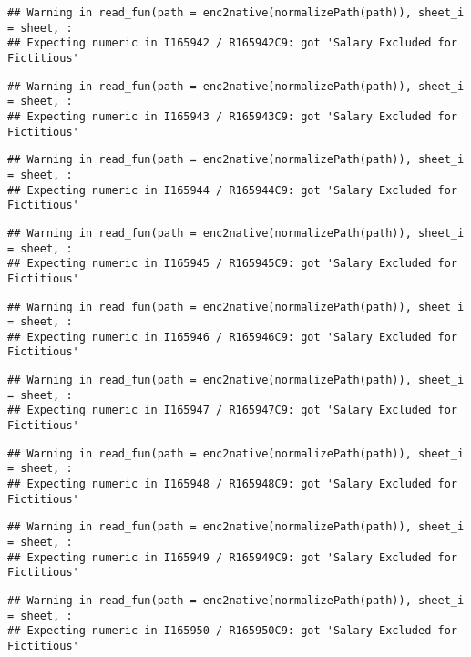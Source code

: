 \documentclass[
]{article}
\begin{document}
\begin{verbatim}
## Warning in read_fun(path = enc2native(normalizePath(path)), sheet_i = sheet, :
## Expecting numeric in I165942 / R165942C9: got 'Salary Excluded for Fictitious'
\end{verbatim}

\begin{verbatim}
## Warning in read_fun(path = enc2native(normalizePath(path)), sheet_i = sheet, :
## Expecting numeric in I165943 / R165943C9: got 'Salary Excluded for Fictitious'
\end{verbatim}

\begin{verbatim}
## Warning in read_fun(path = enc2native(normalizePath(path)), sheet_i = sheet, :
## Expecting numeric in I165944 / R165944C9: got 'Salary Excluded for Fictitious'
\end{verbatim}

\begin{verbatim}
## Warning in read_fun(path = enc2native(normalizePath(path)), sheet_i = sheet, :
## Expecting numeric in I165945 / R165945C9: got 'Salary Excluded for Fictitious'
\end{verbatim}

\begin{verbatim}
## Warning in read_fun(path = enc2native(normalizePath(path)), sheet_i = sheet, :
## Expecting numeric in I165946 / R165946C9: got 'Salary Excluded for Fictitious'
\end{verbatim}

\begin{verbatim}
## Warning in read_fun(path = enc2native(normalizePath(path)), sheet_i = sheet, :
## Expecting numeric in I165947 / R165947C9: got 'Salary Excluded for Fictitious'
\end{verbatim}

\begin{verbatim}
## Warning in read_fun(path = enc2native(normalizePath(path)), sheet_i = sheet, :
## Expecting numeric in I165948 / R165948C9: got 'Salary Excluded for Fictitious'
\end{verbatim}

\begin{verbatim}
## Warning in read_fun(path = enc2native(normalizePath(path)), sheet_i = sheet, :
## Expecting numeric in I165949 / R165949C9: got 'Salary Excluded for Fictitious'
\end{verbatim}

\begin{verbatim}
## Warning in read_fun(path = enc2native(normalizePath(path)), sheet_i = sheet, :
## Expecting numeric in I165950 / R165950C9: got 'Salary Excluded for Fictitious'
\end{verbatim}
\end{document}
